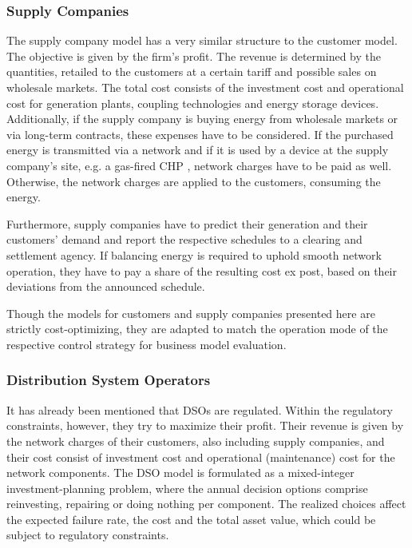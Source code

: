 \documentclass[review]{elsarticle}
\begin{document}
\subsubsection{Supply Companies}
\noindent
The supply company model has a very similar structure to the customer
model. The objective is given by the firm’s profit. The revenue is
determined by the quantities, retailed to the customers at a certain tariff
and possible sales on
wholesale markets.
The
total cost consists of the investment cost and operational cost for
generation plants, coupling technologies and energy storage
devices. Additionally, if the supply company is buying energy from
wholesale markets or via long-term contracts, these expenses have to
be considered. If the purchased energy is transmitted via a network
and if it is used by a device at the supply company’s site, e.g. a gas-fired CHP
, network charges have to be paid as well. Otherwise, the
network charges are applied to the customers, consuming the energy. 

Furthermore, supply companies have to predict their generation and
their customers’ demand and report the respective schedules to a
clearing and settlement agency. If balancing energy is required to
uphold smooth network operation, they have to pay a share of the
resulting cost ex post, based on their deviations from the announced
schedule. 

Though the models for customers and supply companies presented here
are strictly cost-optimizing, they are adapted to match the operation
mode of the respective control strategy for business model
evaluation. 

\subsubsection{Distribution System Operators}
\noindent
It has already been mentioned that DSOs are regulated. Within the
regulatory constraints, however, they try to maximize their
profit. Their revenue is given by the network charges of their
customers, also including supply companies, and their cost consist of
investment cost and operational (maintenance) cost for the network
components. The DSO model is formulated as a mixed-integer
investment-planning problem, where the annual decision options
comprise reinvesting, repairing or doing nothing per component. The
realized choices affect the expected failure rate, the cost and the
total asset value, which could be subject to regulatory constraints. 
\end{document}
